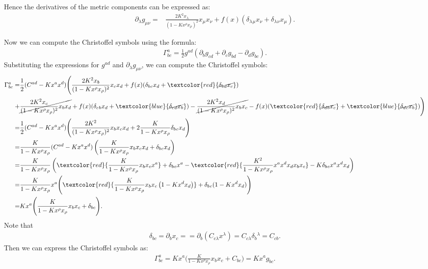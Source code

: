 Hence the derivatives of the metric components can be expressed as:
\begin{align}
    \partial_\lambda g_{\mu\nu} =& \frac{2K^2 x_\lambda}{(1-Kx^\rho x_\rho)^2} x_\mu x_\nu + f(x) (\delta_\lambda{}_\mu x_\nu + \delta_\lambda{}_\nu x_\mu ).
\end{align}

Now we can compute the Christoffel symbols using the formula:
\begin{align}
    \Gamma^a_{bc} = \frac{1}{2} g^{ad} (\partial_b g_{cd} + \partial_c g_{bd} - \partial_d g_{bc}).
\end{align}
Substituting the expressions for $g^{ad}$ and $\partial_\lambda g_{\mu\nu}$, we can compute the Christoffel symbols: 
\begin{align}
    \Gamma^a_{bc} =& \frac{1}{2} (C^{ad} - K x^a x^d) \Bigg( \frac{2K^2 x_b}{(1-Kx^\rho x_\rho)^2} x_c x_d + f(x) (\delta_b{}_{c} x_d + \textcolor{red}{\cancel{\delta_b{}_{d} x_c}} ) \\
    +& \cancel{\frac{2K^2 x_c}{(1-Kx^\rho x_\rho)^2} x_b x_d} + f(x) (\delta_c{}_{b} x_d + \textcolor{blue}{\cancel{\delta_c{}_{d} x_b}} ) - \cancel{\frac{2K^2 x_d}{(1-Kx^\rho x_\rho)^2} x_b x_c} - f(x) (\textcolor{red}{\cancel{\delta_d{}_{b} x_c}} + \textcolor{blue}{\cancel{\delta_d{}_{c} x_b}} )\Bigg)\\
    =& \frac{1}{2} (C^{ad} - K x^a x^d) \Bigg( \frac{2K^2 }{(1-Kx^\rho x_\rho)^2}x_b x_c x_d + 2\frac{K}{1-Kx^\rho x_\rho} \delta_b{}_{c} x_d \Bigg)\\
    =& \frac{K}{1-Kx^\rho x_\rho} (C^{ad} - K x^a x^d) \left( \frac{K}{1-Kx^\rho x_\rho} x_b x_c x_d + \delta_b{}_{c} x_d \right)\\    
    =& \frac{K}{1-Kx^\rho x_\rho} \left( \textcolor{red}{\frac{K}{1-Kx^\rho x_\rho} x_b x_c x^a} + \delta_b{}_{c} x^a - \textcolor{red}{\frac{K^2}{1-Kx^\rho x_\rho} x^a x^d x_d x_b x_c} - K\delta_b{}_{c} x^a x^d x_d \right)\\
    =& \frac{K}{1-Kx^\rho x_\rho} x^a \Bigg( \textcolor{red}{\frac{K}{1-Kx^\rho x_\rho}x_b x_c\left( 1 -Kx^d x_d \right)} + \delta_b{}_{c}(1-Kx^d x_d) \Bigg)\\
    =& Kx^a \Bigg( \frac{K}{1-Kx^\rho x_\rho}x_b x_c + \delta_{bc}  \Bigg).
\end{align}
Note that 
\begin{align}
    \delta_{bc}=\partial_b x_c = =\partial_b (C_{c\lambda} x^\lambda) = C_{c\lambda} \delta_b{}^\lambda = C_{cb}.
\end{align}
Then we can express the Christoffel symbols as:
\begin{align}
    \Gamma^a_{bc} = Kx^a \Bigg( \frac{K}{1-Kx^\rho x_\rho}x_b x_c + C_{bc}  \Bigg)=K x^a g_{bc}.
\end{align}

